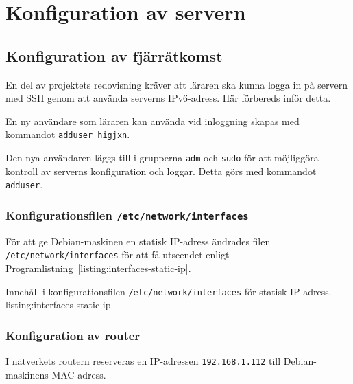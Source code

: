 %
%
%


\section{Konfiguration av servern}
\subsection{Konfiguration av fjärråtkomst}
En del av projektets redovisning kräver att läraren ska kunna logga in på servern
med SSH genom att använda serverns IPv6-adress. Här förbereds inför detta.


En ny användare som läraren kan använda vid inloggning skapas med kommandot
\texttt{adduser higjxn}.

Den nya användaren läggs till i grupperna \texttt{adm} och \texttt{sudo} för
att möjliggöra kontroll av serverns konfiguration och loggar. Detta görs med
kommandot \texttt{adduser}.


\subsubsection{Konfigurationsfilen \texttt{/etc/network/interfaces}}
För att ge Debian-maskinen en statisk IP-adress ändrades filen \texttt{/etc/network/interfaces}
för att få utseendet enligt Programlistning~\ref{listing:interfaces-static-ip}.

            {Innehåll i konfigurationsfilen \texttt{/etc/network/interfaces}
 					   för statisk IP-adress.}
            {listing:interfaces-static-ip}


\subsubsection{Konfiguration av router}
I nätverkets routern reserveras en IP-adressen \texttt{192.168.1.112} till
Debian-maskinens MAC-adress.


